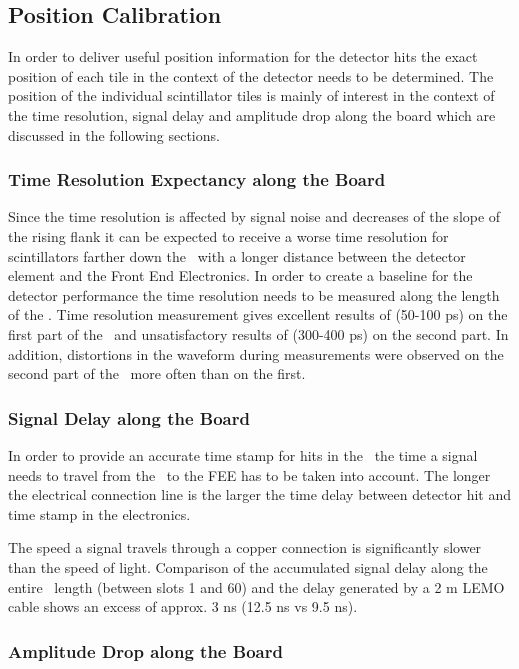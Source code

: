 \documentclass[../BTOF_summary.tex]{subfiles}
\begin{document}
\subsection{Position Calibration}

In order to deliver useful position information for the detector hits the exact position of each tile in the context of the detector needs to be determined.
The position of the individual scintillator tiles is mainly of interest in the context of the time resolution, signal delay and amplitude drop along the board which are discussed in the following sections.

\subsubsection{Time Resolution Expectancy along the Board}

Since the time resolution is affected by signal noise and decreases of the slope of the rising flank it can be expected to receive a worse time resolution for scintillators farther down the \railboard\ with a longer distance between the detector element and the Front End Electronics.
In order to create a baseline for the detector performance the time resolution needs to be measured along the length of the \railboard .
Time resolution measurement gives excellent results of (50-100 ps) on the first part of the \railboard\ and unsatisfactory results of (300-400 ps) on the second part. In addition, distortions in the waveform during measurements were observed on the second part of the \railboard\ more often than on the first. 

\subsubsection{Signal Delay along the Board}

In order to provide an accurate time stamp for hits in the \btofD\ the time a signal needs to travel from the \sipms\ to the FEE has to be taken into account. The longer the electrical connection line is the larger the time delay between detector hit and time stamp in the electronics.

The speed a signal travels through a copper connection is significantly slower than the speed of light.
Comparison of the accumulated signal delay along the entire \railboard\ length (between slots 1 and 60) and the delay generated by a 2 m LEMO cable shows an excess of approx. 3 ns (12.5 ns vs 9.5 ns).

\subsubsection{Amplitude Drop along the Board}
\end{document}
